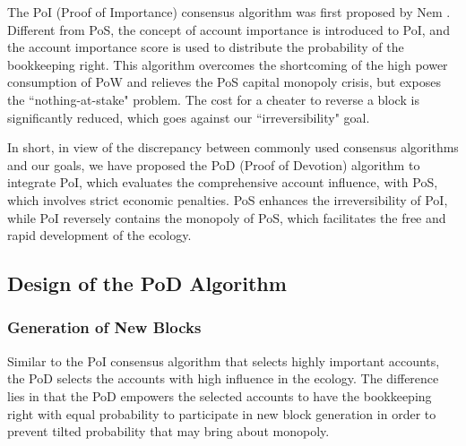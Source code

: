 The PoI (Proof of Importance) consensus algorithm was first proposed by Nem \cite{nem}. Different from PoS, the concept of account importance is introduced to PoI, and the account importance score is used to distribute the probability of the bookkeeping right. This algorithm overcomes the shortcoming of the high power consumption of PoW and relieves the PoS capital monopoly crisis, but exposes the ``nothing-at-stake" problem. The cost for a cheater to reverse a block is significantly reduced, which goes against our ``irreversibility" goal.


In short, in view of the discrepancy between commonly used consensus algorithms and our goals, we have proposed the PoD (Proof of Devotion) algorithm to integrate PoI, which evaluates the comprehensive account influence, with PoS, which involves strict economic penalties. PoS enhances the irreversibility of PoI, while PoI reversely contains the monopoly of PoS, which facilitates the free and rapid development of the ecology.


\subsection{Design of the PoD Algorithm}
\label{pod:design}

\subsubsection{Generation of New Blocks}
\label{pod:design:block}

Similar to the PoI consensus algorithm that selects highly important accounts, the PoD selects the accounts with high influence in the ecology. The difference lies in that the PoD empowers the selected accounts to have the bookkeeping right with equal probability to participate in new block generation in order to prevent tilted probability that may bring about monopoly.

